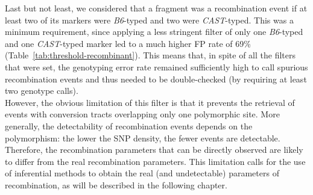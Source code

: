 Last but not least, we considered that a fragment was a recombination event if at least two of its markers were \textit{B6}-typed and two were \textit{CAST}-typed.
This was a minimum requirement, since applying a less stringent filter of only one \textit{B6}-typed and one \textit{CAST}-typed marker led to a much higher FP rate of 69\% (Table~\ref{tab:threshold-recombinant}).
This means that, in spite of all the filters that were set, the genotyping error rate remained sufficiently high to call spurious recombination events and thus needed to be double-checked (by requiring at least two genotype calls).\\



However, the obvious limitation of this filter is that it prevents the retrieval of events with conversion tracts overlapping only one polymorphic site.
More generally, the detectability of recombination events depends on the polymorphism: the lower the SNP density, the fewer events are detectable.
Therefore, the recombination parameters that can be directly observed are likely to differ from the real recombination parameters.
This limitation calls for the use of inferential methods to obtain the real (and undetectable) parameters of recombination, as will be described in the following chapter.










